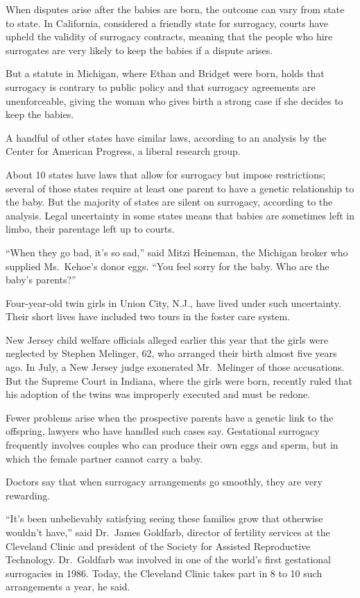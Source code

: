 ﻿\documentclass[12pt]{article}
\begin{document}
When disputes arise after the babies are born, the outcome can vary from state to state. In
California, considered a friendly state for surrogacy, courts have upheld the validity of surrogacy
contracts, meaning that the people who hire surrogates are very likely to keep the babies if a
dispute arises.

But a statute in Michigan, where Ethan and Bridget were born, holds that surrogacy is contrary to
public policy and that surrogacy agreements are unenforceable, giving the woman who gives birth a
strong case if she decides to keep the babies.

A handful of other states have similar laws, according to an analysis by the Center for American
Progress, a liberal research group.

About 10 states have laws that allow for surrogacy but impose restrictions; several of those states
require at least one parent to have a genetic relationship to the baby. But the majority of states
are silent on surrogacy, according to the analysis. Legal uncertainty in some states means that
babies are sometimes left in limbo, their parentage left up to courts.

``When they go bad, it's so sad,'' said Mitzi Heineman, the Michigan broker who supplied Ms.~Kehoe's
donor eggs. ``You feel sorry for the baby. Who are the baby's parents?''

Four-year-old twin girls in Union City, N.J., have lived under such uncertainty. Their short lives
have included two tours in the foster care system.

New Jersey child welfare officials alleged earlier this year that the girls were neglected by
Stephen Melinger, 62, who arranged their birth almost five years ago. In July, a New Jersey judge
exonerated Mr.~Melinger of those accusations. But the Supreme Court in Indiana, where the girls were
born, recently ruled that his adoption of the twins was improperly executed and must be redone.

Fewer problems arise when the prospective parents have a genetic link to the offspring, lawyers who
have handled such cases say. Gestational surrogacy frequently involves couples who can produce their
own eggs and sperm, but in which the female partner cannot carry a baby.

Doctors say that when surrogacy arrangements go smoothly, they are very rewarding.

``It's been unbelievably satisfying seeing these families grow that otherwise wouldn't have,'' said
Dr.~James Goldfarb, director of fertility services at the Cleveland Clinic and president of the
Society for Assisted Reproductive Technology. Dr.~Goldfarb was involved in one of the world's first
gestational surrogacies in 1986. Today, the Cleveland Clinic takes part in 8 to 10 such arrangements
a year, he said.
\end{document}
